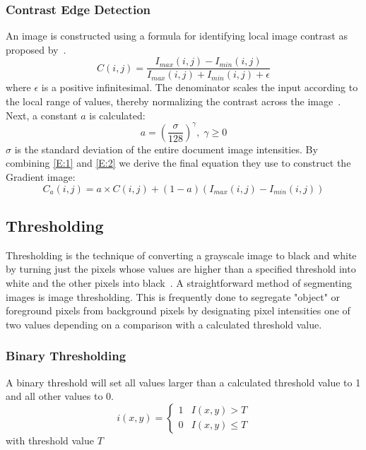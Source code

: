 \documentclass[a4paper, 12pt]{report}
\begin{document}
\subsubsection{Contrast Edge Detection}
An image is constructed using a formula for identifying local image contrast as
proposed by~\cite{su2012robust}.
\begin{equation}
    \label{E:1}
    C(i,j)=\frac{I_{max}(i,j)-I_{min}(i,j)}{I_{max}(i,j)+I_{min}(i,j)+\epsilon}
\end{equation}
where \(\epsilon\) is a positive infinitesimal. The denominator scales the input according to the local range of values, thereby normalizing the contrast across the image~\cite{su2012robust}. Next, a constant \(a\) is calculated:
\begin{equation}
    \label{E:2}
    a=(\frac{\sigma}{128})^\gamma, \; \gamma \geq 0
\end{equation}
\(\sigma\) is the standard deviation of the entire document image intensities.
By combining \ref{E:1} and \ref{E:2} we derive the final equation they use to construct the Gradient image:
\begin{equation}
    \label{E:3}
    C_a(i,j)=a\times C(i,j)+(1-a)(I_{max}(i,j)-I_{min}(i,j))
\end{equation}

\subsection{Thresholding}
Thresholding is the technique of converting a grayscale image to black and
white by turning just the pixels whose values are higher than a specified
threshold into white and the other pixels into black~\cite{inproceedings}. A
straightforward method of segmenting images is image thresholding. This is
frequently done to segregate "object" or foreground pixels from background
pixels by designating pixel intensities one of two values depending on a
comparison with a calculated threshold value.

\subsubsection{Binary Thresholding}
A binary threshold will set all values larger than a calculated threshold value
to 1 and all other values to 0.
\[
    i(x,y)=
    \begin{cases}
        1 & I(x,y) > T    \\
        0 & I(x,y) \leq T
    \end{cases}
\]
with threshold value $T$
\end{document}
